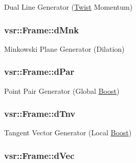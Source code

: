 Dual Line Generator (\hyperlink{classvsr_1_1_twist}{Twist} Momentum) \hypertarget{classvsr_1_1_frame_ac6b5bd3194360ef2a0391236e5fcf893}{
\subsubsection[{d\-Mnk}]{ {\bf vsr\-::\-Frame\-::d\-Mnk}}}\label{classvsr_1_1_frame_ac6b5bd3194360ef2a0391236e5fcf893}
Minkowski Plane Generator (Dilation) \hypertarget{classvsr_1_1_frame_a7431a1d5353c31e91ecb6b4f3b5a0971}{
\subsubsection[{d\-Par}]{ {\bf vsr\-::\-Frame\-::d\-Par}}}\label{classvsr_1_1_frame_a7431a1d5353c31e91ecb6b4f3b5a0971}
Point Pair Generator (Global \hyperlink{classvsr_1_1_boost}{Boost}) \hypertarget{classvsr_1_1_frame_aa207ba6af083c439b431028aa9f37524}{
\subsubsection[{d\-Tnv}]{ {\bf vsr\-::\-Frame\-::d\-Tnv}}}\label{classvsr_1_1_frame_aa207ba6af083c439b431028aa9f37524}
Tangent Vector Generator (Local \hyperlink{classvsr_1_1_boost}{Boost}) \hypertarget{classvsr_1_1_frame_ad42f1e4d6c5f4f6a9b50c0f59713aa99}{
\subsubsection[{d\-Vec}]{ {\bf vsr\-::\-Frame\-::d\-Vec}}}\label{classvsr_1_1_frame_ad42f1e4d6c5f4f6a9b50c0f59713aa99}
